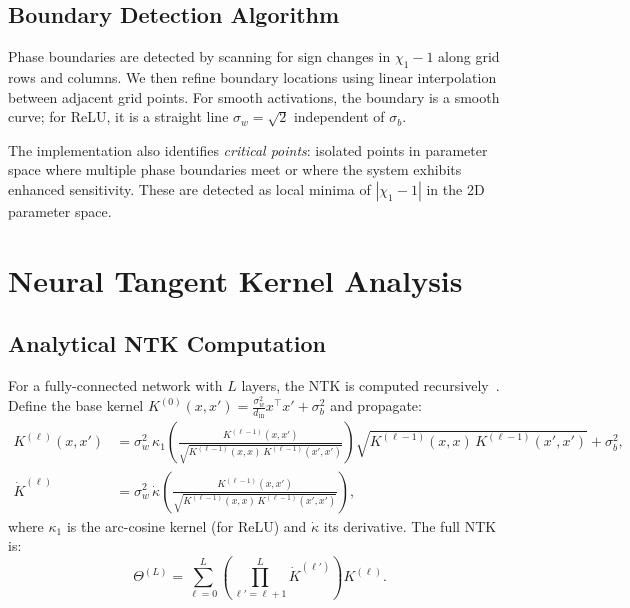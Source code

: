 \documentclass[10pt]{article}
\theoremstyle{definition}
\begin{document}
\subsection{Boundary Detection Algorithm}

Phase boundaries are detected by scanning for sign changes in $\chi_1 - 1$ along grid rows and columns.
We then refine boundary locations using linear interpolation between adjacent grid points.
For smooth activations, the boundary is a smooth curve; for ReLU, it is a straight line $\sigma_w = \sqrt{2}$ independent of $\sigma_b$.

The implementation also identifies \emph{critical points}: isolated points in parameter space where multiple phase boundaries meet or where the system exhibits enhanced sensitivity.
These are detected as local minima of $|\chi_1 - 1|$ in the 2D parameter space.

\section{Neural Tangent Kernel Analysis}
\label{sec:ntk}

\subsection{Analytical NTK Computation}

For a fully-connected network with $L$ layers, the NTK is computed recursively~\citep{jacot2018neural}.
Define the base kernel $K^{(0)}(x, x') = \frac{\sigma_w^2}{d_{\text{in}}} x^\top x' + \sigma_b^2$ and propagate:
\begin{align}
  K^{(\ell)}(x, x') &= \sigma_w^2 \, \kappa_1\!\left(\frac{K^{(\ell-1)}(x,x')}{\sqrt{K^{(\ell-1)}(x,x) \, K^{(\ell-1)}(x',x')}}\right) \sqrt{K^{(\ell-1)}(x,x) \, K^{(\ell-1)}(x',x')} + \sigma_b^2, \label{eq:kernel-recursion} \\
  \dot{K}^{(\ell)} &= \sigma_w^2 \, \dot{\kappa}\!\left(\frac{K^{(\ell-1)}(x,x')}{\sqrt{K^{(\ell-1)}(x,x) \, K^{(\ell-1)}(x',x')}}\right), \label{eq:dot-kernel}
\end{align}
where $\kappa_1$ is the arc-cosine kernel (for ReLU) and $\dot{\kappa}$ its derivative.
The full NTK is:
\begin{equation}
  \Theta^{(L)} = \sum_{\ell=0}^{L} \left(\prod_{\ell'=\ell+1}^{L} \dot{K}^{(\ell')}\right) K^{(\ell)}.
  \label{eq:ntk-recursive}
\end{equation}
\end{document}
